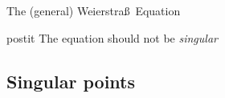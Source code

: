 \documentclass[10pt,handout]{beamer} %
\theoremstyle{definition}
\begin{document}
\begin{frame}{The (general) Weierstra\ss\ Equation}
\begin{center}
\pause
{}\pause
{}\pause
\end{center}

 \begin{beamercolorbox}[sep=1em,wd=5.5cm]{postit}
 The equation should not be \emph{singular}
 \end{beamercolorbox}
\end{frame}

\subsection{Singular points}
\end{document}
